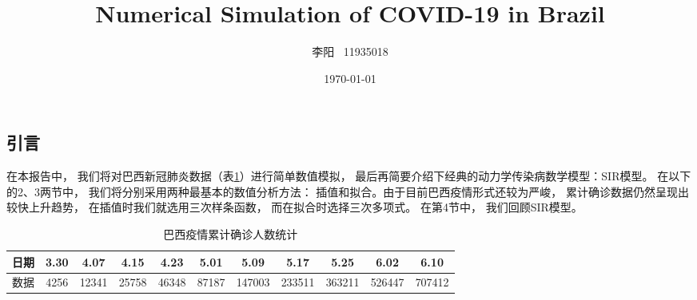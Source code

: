 \documentclass[a4paper]{article}
\begin{document}
\begin{CJK*}{UTF8}{gkai}
  \CJKindent
  \makeatletter %
  \def\@cite#1#2{\textsuperscript{[{#1\if@tempswa , #2\fi}]}}
  \makeatother
  \newtheorem{theorem}{{定理}}
  \newtheorem{proposition}[theorem]{{命题}}
  \newtheorem{lemma}[theorem]{{引理}}
  \newtheorem{corollary}[theorem]{{推论}}
  \newtheorem{definition}[theorem]{{定义}}
  \newtheorem{question}[theorem]{{问题}}

  \renewcommand{\refname}{\centerline{参考文献}}
  \renewcommand{\tablename}{表}
  \renewcommand{\figurename}{图}
  \renewcommand{\abstractname}{摘要}
  
  \title{Numerical Simulation of COVID-19 in Brazil}
  \author{李阳 \, 11935018}
  \date{\today}

  \maketitle







  \pagestyle{fancy}
  \fancyhead{}
  \chead{}

  \section{引言}
  在本报告中，
  我们将对巴西新冠肺炎数据（表\ref{fig:numbers}）进行简单数值模拟，
  最后再简要介绍下经典的动力学传染病数学模型：SIR模型。
  在以下的2、3两节中，
  我们将分别采用两种最基本的数值分析方法：
  插值和拟合。由于目前巴西疫情形式还较为严峻，
  累计确诊数据仍然呈现出较快上升趋势，
  在插值时我们就选用三次样条函数，
  而在拟合时选择三次多项式。
  在第4节中，
  我们回顾SIR模型。
  \begin{table}[H]
    \centering
    \begin{tabular}[H]{|c|c|c|c|c|c|c|c|c|c|c|}
      \hline
      日期 & 3.30 & 4.07 & 4.15 & 4.23 & 5.01 & 5.09 & 5.17 & 5.25 & 6.02 & 6.10 \\
      \hline
      数据 & 4256 & 12341 & 25758 & 46348 & 87187 & 147003 & 233511 & 363211 & 526447 & 707412 \\
      \hline
    \end{tabular}
    \caption{巴西疫情累计确诊人数统计}
    \label{fig:numbers}
  \end{table}


\end{CJK*}
\end{document}
